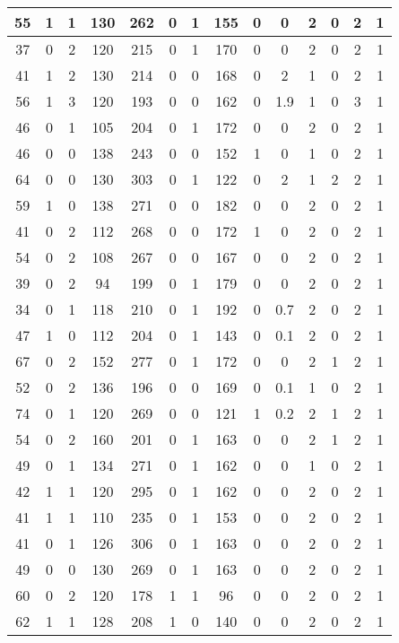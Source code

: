 \documentclass{article}
\begin{document}
\begin{longtable}{|c|c|c|c|c|c|c|c|c|c|c|c|c|c|}
55 & 1 & 1 & 130 & 262 & 0 & 1 & 155 & 0 & 0 & 2 & 0 & 2 & 1 \\ \hline
37 & 0 & 2 & 120 & 215 & 0 & 1 & 170 & 0 & 0 & 2 & 0 & 2 & 1 \\ \hline
41 & 1 & 2 & 130 & 214 & 0 & 0 & 168 & 0 & 2 & 1 & 0 & 2 & 1 \\ \hline
56 & 1 & 3 & 120 & 193 & 0 & 0 & 162 & 0 & 1.9 & 1 & 0 & 3 & 1 \\ \hline
46 & 0 & 1 & 105 & 204 & 0 & 1 & 172 & 0 & 0 & 2 & 0 & 2 & 1 \\ \hline
46 & 0 & 0 & 138 & 243 & 0 & 0 & 152 & 1 & 0 & 1 & 0 & 2 & 1 \\ \hline
64 & 0 & 0 & 130 & 303 & 0 & 1 & 122 & 0 & 2 & 1 & 2 & 2 & 1 \\ \hline
59 & 1 & 0 & 138 & 271 & 0 & 0 & 182 & 0 & 0 & 2 & 0 & 2 & 1 \\ \hline
41 & 0 & 2 & 112 & 268 & 0 & 0 & 172 & 1 & 0 & 2 & 0 & 2 & 1 \\ \hline
54 & 0 & 2 & 108 & 267 & 0 & 0 & 167 & 0 & 0 & 2 & 0 & 2 & 1 \\ \hline
39 & 0 & 2 & 94 & 199 & 0 & 1 & 179 & 0 & 0 & 2 & 0 & 2 & 1 \\ \hline
34 & 0 & 1 & 118 & 210 & 0 & 1 & 192 & 0 & 0.7 & 2 & 0 & 2 & 1 \\ \hline
47 & 1 & 0 & 112 & 204 & 0 & 1 & 143 & 0 & 0.1 & 2 & 0 & 2 & 1 \\ \hline
67 & 0 & 2 & 152 & 277 & 0 & 1 & 172 & 0 & 0 & 2 & 1 & 2 & 1 \\ \hline
52 & 0 & 2 & 136 & 196 & 0 & 0 & 169 & 0 & 0.1 & 1 & 0 & 2 & 1 \\ \hline
74 & 0 & 1 & 120 & 269 & 0 & 0 & 121 & 1 & 0.2 & 2 & 1 & 2 & 1 \\ \hline
54 & 0 & 2 & 160 & 201 & 0 & 1 & 163 & 0 & 0 & 2 & 1 & 2 & 1 \\ \hline
49 & 0 & 1 & 134 & 271 & 0 & 1 & 162 & 0 & 0 & 1 & 0 & 2 & 1 \\ \hline
42 & 1 & 1 & 120 & 295 & 0 & 1 & 162 & 0 & 0 & 2 & 0 & 2 & 1 \\ \hline
41 & 1 & 1 & 110 & 235 & 0 & 1 & 153 & 0 & 0 & 2 & 0 & 2 & 1 \\ \hline
41 & 0 & 1 & 126 & 306 & 0 & 1 & 163 & 0 & 0 & 2 & 0 & 2 & 1 \\ \hline
49 & 0 & 0 & 130 & 269 & 0 & 1 & 163 & 0 & 0 & 2 & 0 & 2 & 1 \\ \hline
60 & 0 & 2 & 120 & 178 & 1 & 1 & 96 & 0 & 0 & 2 & 0 & 2 & 1 \\ \hline
62 & 1 & 1 & 128 & 208 & 1 & 0 & 140 & 0 & 0 & 2 & 0 & 2 & 1 \\ \hline

\end{longtable}
\end{document}
